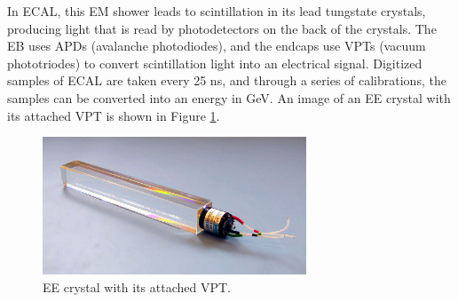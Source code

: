 In ECAL, this EM shower leads to scintillation in its lead tungstate crystals, producing light that is read by photodetectors on the back of the crystals. The EB uses APDs (avalanche photodiodes), and the endcaps use VPTs (vacuum phototriodes) to convert scintillation light into an electrical signal. Digitized samples of ECAL are taken every 25 ns, and through a series of calibrations, the samples can be converted into an energy in GeV. An image of an EE crystal with its attached VPT is shown in Figure \ref{fig:ECAL_XTAL}.


\begin{figure}[H]
    \centering
    \includegraphics[width=0.7\textwidth]{Images/ECAL/Introduction/SC_VPT_and_crystal.jpg}    
    \caption{EE crystal with its attached VPT.}
    \label{fig:ECAL_XTAL}
\end{figure}